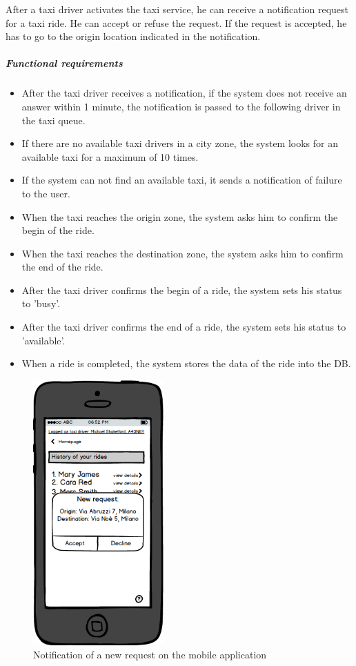 After a taxi driver activates the taxi service, he can receive a notification request for a taxi ride. He can accept or refuse the request. If the request is accepted, he has to go to the origin location indicated in the notification.

\subparagraph{Functional requirements}
\noindent
    \begin{itemize}
        \item After the taxi driver receives a notification, if the system does not receive an answer within 1 minute, the notification is passed to the following driver in the taxi queue.
        \item If there are no available taxi drivers in a city zone, the system looks for an available taxi for a maximum of 10 times. 
        \item If the system can not find an available taxi, it sends a notification of failure to the user.
        \item When the taxi reaches the origin zone, the system asks him to confirm the begin of the ride.
        \item When the taxi reaches the destination zone, the system asks him to confirm the end of the ride.
        \item After the taxi driver confirms the begin of a ride, the system sets his status to 'busy'.
        \item After the taxi driver confirms the end of a ride, the system sets his status to 'available'.
        \item When a ride is completed, the system stores the data of the ride into the DB.
    \end{itemize}
    
\begin{figure}[H]
    \centering
    \includegraphics[width=5cm]{./Mockups/RequestHandling.png}
    \caption{Notification of a new request on the mobile application}
\end{figure}
